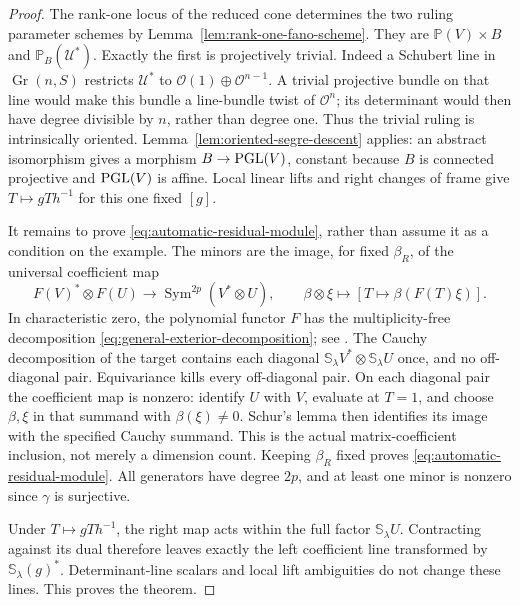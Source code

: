 \documentclass[11pt,reqno]{amsart}
\numberwithin{equation}{section}
\theoremstyle{definition}\newtheorem{definition}[theorem]{Definition}
\theoremstyle{remark}\newtheorem{remark}[theorem]{Remark}
\newcommand{\Pj}{\mathbb P}\newcommand{\A}{\mathbb A}
\newcommand{\OO}{\mathcal O}\newcommand{\II}{\mathcal I}
\DeclareMathOperator{\Sym}{Sym}\DeclareMathOperator{\Gr}{Gr}
\begin{document}
\begin{proof}
The rank-one locus of the reduced cone determines the two ruling
parameter schemes by Lemma~\ref{lem:rank-one-fano-scheme}.  They are
\(\Pj(V)\times B\) and \(\Pj_B(\mathcal U^*)\).
Exactly the first is projectively trivial.  Indeed a Schubert line in
\(\Gr(n,S)\) restricts \(\mathcal U^*\) to
\(\OO(1)\oplus\OO^{n-1}\).  A trivial projective bundle on
that line would make this bundle a line-bundle twist of
\(\OO^n\); its determinant would then have degree divisible by
\(n\), rather than degree one.  Thus the trivial ruling is
intrinsically oriented.  Lemma~\ref{lem:oriented-segre-descent}
applies: an abstract isomorphism gives a morphism \(B\to\operatorname{PGL}(V)\),
constant because \(B\) is connected projective and \(\operatorname{PGL}(V)\)
is affine.  Local linear lifts and right changes of frame give
\(T\mapsto gTh^{-1}\) for this one fixed \([g]\).

It remains to prove \eqref{eq:automatic-residual-module}, rather
than assume it as a condition on the example.  The minors are the
image, for fixed \(\beta_R\), of the universal coefficient map
\begin{equation}\label{eq:general-coefficient-map}
 F(V)^*\otimes F(U)\longrightarrow
 \Sym^{2p}(V^*\otimes U),\qquad
 \beta\otimes\xi\longmapsto[T\mapsto\beta(F(T)\xi)].
\end{equation}
In characteristic zero, the polynomial functor \(F\) has the
multiplicity-free decomposition \eqref{eq:general-exterior-decomposition};
see \cite[Theorem~3.5]{ChengWang}.  The Cauchy decomposition of the
target contains each diagonal
\(\mathbb S_\lambda V^*\otimes\mathbb S_\lambda U\)
once, and no off-diagonal pair.  Equivariance kills every
off-diagonal pair.  On each diagonal pair the coefficient map is
nonzero: identify \(U\) with \(V\), evaluate at \(T=1\), and
choose \(\beta,\xi\) in that summand with
\(\beta(\xi)\ne0\).  Schur's lemma then identifies its image
with the specified Cauchy summand.  This is the actual matrix-coefficient
inclusion, not merely a dimension count.  Keeping \(\beta_R\)
fixed proves \eqref{eq:automatic-residual-module}.  All generators
have degree \(2p\), and at least one minor is nonzero since
\(\gamma\) is surjective.

Under \(T\mapsto gTh^{-1}\), the right map acts within the full
factor \(\mathbb S_\lambda U\).  Contracting against its dual
therefore leaves exactly the left coefficient line transformed by
\(\mathbb S_\lambda(g)^*\).  Determinant-line scalars and local
lift ambiguities do not change these lines.  This proves the theorem.
\end{proof}
\end{document}
